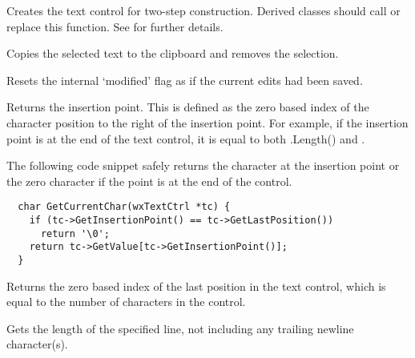 Creates the text control for two-step construction. Derived classes
should call or replace this function. See \rtfsp
for further details.

\label{wxtextctrlcut}


Copies the selected text to the clipboard and removes the selection.



Resets the internal `modified' flag as if the current edits had been saved.

\label{wxtextctrlgetinsertionpoint}


Returns the insertion point. This is defined as the zero based index of the
character position to the right of the insertion point. For example, if
the insertion point is at the end of the text control, it is equal to
both .Length() and
.

The following code snippet safely returns the character at the insertion
point or the zero character if the point is at the end of the control.

{\small%
\begin{verbatim}
  char GetCurrentChar(wxTextCtrl *tc) {
    if (tc->GetInsertionPoint() == tc->GetLastPosition())
      return '\0';
    return tc->GetValue[tc->GetInsertionPoint()];
  }
\end{verbatim}
}%

\label{wxtextctrlgetlastposition}


Returns the zero based index of the last position in the text control,
which is equal to the number of characters in the control.

\label{wxtextctrlgetlinelength}


Gets the length of the specified line, not including any trailing newline
character(s).

